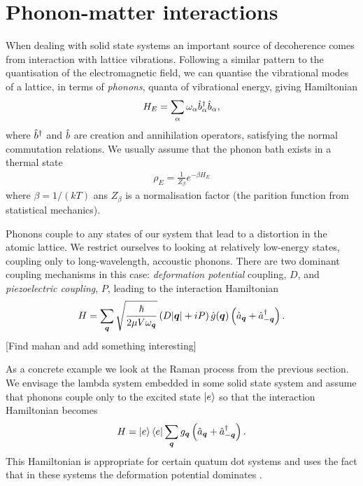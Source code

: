 \section{Phonon-matter interactions}

When dealing with solid state systems an important source of decoherence comes from interaction with lattice vibrations. Following a similar pattern to the quantisation of the electromagnetic field, we can quantise the vibrational modes of a lattice, in terms of \textit{phonons}, quanta of vibrational energy, giving Hamiltonian
\begin{align}
  H_E = \sum_\alpha \omega_\alpha \hat{b}^\dagger_\alpha \hat{b}_\alpha,
\end{align}
where $\hat{b}^\dagger$ and $\hat{b}$ are creation and annihilation operators, satisfying the normal commutation relations. We usually assume that the phonon bath exists in a thermal state
\begin{align}
  \rho_E = \frac{1}{Z_\beta} e^{-\beta H_E}
\end{align}
where $\beta = 1/(kT)$ ans $Z_\beta$ is a normalisation factor (the parition function from statistical mechanics).

Phonons couple to any states of our system that lead to a distortion in the atomic lattice. We restrict ourselves to looking at relatively low-energy states, coupling only to long-wavelength, accoustic phonons. There are two dominant coupling mechanisms in this case: \textit{deformation potential} coupling, $D$, and \textit{piezoelectric coupling}, $P$, \cite{mahan} leading to the interaction Hamiltonian
\begin{align}
  H = \sum_{{\boldsymbol{q}}} \sqrt{\frac{\hbar}{2\mu V\omega_{{\boldsymbol{q}}}}} \left(D \vert {\boldsymbol{q}}\vert + iP \right)\hat{g}({\boldsymbol{q}})\left(\hat{a}_{{\boldsymbol{q}}} + \hat{a}^\dagger_{-{\boldsymbol{q}}} \right).
\end{align}
[Find mahan and add something interesting]

As a concrete example we look at the Raman process from the previous section. We envisage the lambda system embedded in some solid state system and assume that phonons couple only to the excited state $\left\vert e\right\rangle$ so that the interaction Hamiltonian becomes
\begin{align}
  H = \left\vert e\right\rangle\left\langle e\right\vert\sum_{{\boldsymbol{q}}} g_{{\boldsymbol{q}}}\left(\hat{a}_{{\boldsymbol{q}}} + \hat{a}^\dagger_{-{\boldsymbol{q}}}\right).
\end{align}
This Hamiltonian is appropriate for certain quatum dot systems \cite{erik_qd_paper} and uses the fact that in these systems the deformation potential dominates \cite{ep76, ep138}.

